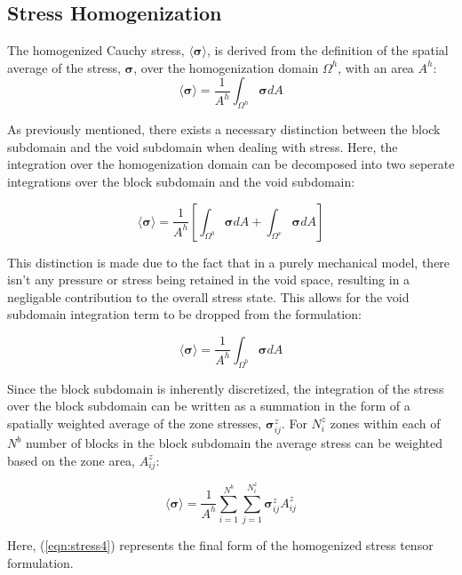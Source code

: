 \subsection{Stress Homogenization}

The homogenized Cauchy stress, $\langle\boldsymbol{\sigma}\rangle$, is derived from the definition of the spatial average of the stress, $\boldsymbol{\sigma}$, over the homogenization domain $\Omega^{h}$, with an area $A^{h}$: 
\begin{equation}
\langle\boldsymbol{\sigma}\rangle=\frac{1}{A^{h}}\int_{\Omega^{h}}\boldsymbol{\sigma}dA\label{eqn:stress1}
\end{equation}


As previously mentioned, there exists a necessary distinction between the block subdomain and the void subdomain when dealing with stress. Here, the integration over the homogenization domain can be decomposed into two seperate integrations over the block subdomain and the void subdomain: 

\begin{equation}
\langle\boldsymbol{\sigma}\rangle=\frac{1}{A^{h}}\left[\int_{\Omega^{b}}\boldsymbol{\sigma}dA+\int_{\Omega^{v}}\boldsymbol{\sigma}dA\right]\label{eqn:stress2}
\end{equation}

This distinction is made due to the fact that in a purely mechanical model, there isn't any pressure or stress being retained in the void space, resulting in a negligable contribution to the overall stress state. This allows for the void subdomain integration term to be dropped from the formulation: 

\begin{equation}
\langle\boldsymbol{\sigma}\rangle=\frac{1}{A^{h}}\int_{\Omega^{b}}\boldsymbol{\sigma}dA\label{eqn:stress2a}
\end{equation}

Since the block subdomain is inherently discretized, the integration of the stress over the block subdomain can be written as a summation in the form of a spatially weighted average of the zone stresses, $\boldsymbol{\sigma}_{ij}^{z}$. For $N_{i}^{z}$ zones within each of $N^{b}$ number of blocks in the block subdomain the average stress can be weighted based on the zone area, $A_{ij}^{z}$: 

\begin{equation}
\langle\boldsymbol{\sigma}\rangle=\frac{1}{A^{h}}\sum_{i=1}^{N^{b}}\sum_{j=1}^{N_{i}^{z}}\boldsymbol{\sigma}_{ij}^{z}A_{ij}^{z}\label{eqn:stress4}
\end{equation}

Here, (\ref{eqn:stress4}) represents the final form of the homogenized stress tensor formulation.